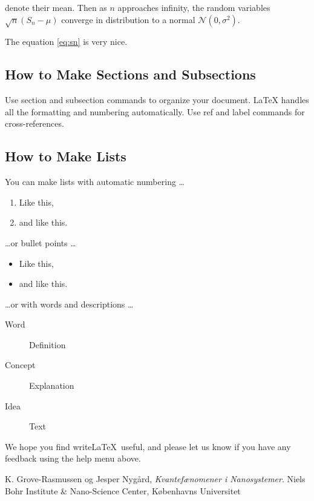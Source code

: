 \documentclass[a4paper]{article}
\begin{document}
denote their mean. Then as $n$ approaches infinity, the random variables $\sqrt{n}(S_n - \mu)$ converge in distribution to a normal $\mathcal{N}(0, \sigma^2)$.

The equation \ref{eq:sn} is very nice.

\subsection{How to Make Sections and Subsections}

Use section and subsection commands to organize your document. \LaTeX{} handles all the formatting and numbering automatically. Use ref and label commands for cross-references.

\subsection{How to Make Lists}

You can make lists with automatic numbering \dots

\begin{enumerate}
\item Like this,
\item and like this.
\end{enumerate}
\dots or bullet points \dots
\begin{itemize}
\item Like this,
\item and like this.
\end{itemize}
\dots or with words and descriptions \dots
\begin{description}
\item[Word] Definition
\item[Concept] Explanation
\item[Idea] Text
\end{description}

We hope you find write\LaTeX\ useful, and please let us know if you have any feedback using the help menu above.

\begin{thebibliography}{9}
  K. Grove-Rasmussen og Jesper Nygård,
  \emph{Kvantefænomener i Nanosystemer}.
  Niels Bohr Institute \& Nano-Science Center, Københavns Universitet

\end{thebibliography}
\end{document}
